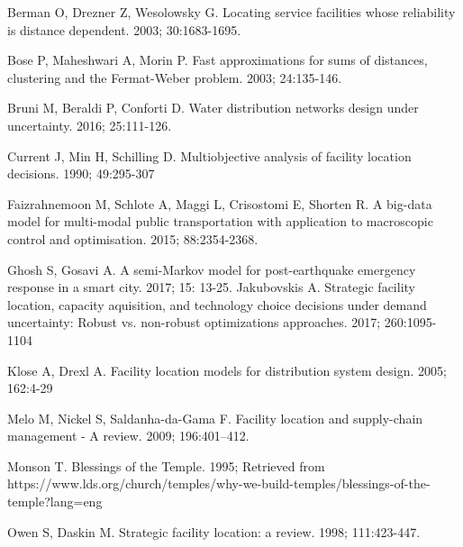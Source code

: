 \documentclass[twoside,twocolumn]{article}
\begin{document}
\begin{thebibliography}{99}

Berman O, Drezner Z, Wesolowsky G.
\newblock Locating service facilities whose reliability is distance dependent.
 2003; 30:1683-1695.

Bose P, Maheshwari A, Morin P.
\newblock Fast approximations for sums of distances, clustering and the Fermat-Weber problem.
 2003; 24:135-146.

Bruni M, Beraldi P, Conforti D.
\newblock Water distribution networks design under uncertainty.
 2016; 25:111-126.

Current J, Min H, Schilling D.
\newblock Multiobjective analysis of facility location decisions.
 1990; 49:295-307

Faizrahnemoon M, Schlote A, Maggi L, Crisostomi E, Shorten R.
\newblock A big-data model for multi-modal public transportation with application to macroscopic control and optimisation.
 2015; 88:2354-2368.

Ghosh S, Gosavi A.
\newblock A semi-Markov model for post-earthquake emergency response in a smart city.
 2017; 15: 13-25.
Jakubovskis A.
\newblock Strategic facility location, capacity aquisition, and technology choice decisions under demand uncertainty: Robust vs. non-robust optimizations approaches.
 2017; 260:1095-1104

Klose A, Drexl A.
\newblock Facility location models for distribution system design.
 2005; 162:4-29

Melo M, Nickel S, Saldanha-da-Gama F.
\newblock Facility location and supply-chain management - A review.
  2009; 196:401--412.

Monson T.
\newblock Blessings of the Temple. 1995;
\newblock Retrieved from https://www.lds.org/church/temples/why-we-build-temples/blessings-of-the-temple?lang=eng

Owen S, Daskin M.
\newblock Strategic facility location: a review.
 1998; 111:423-447.

\end{thebibliography}
\end{document}
